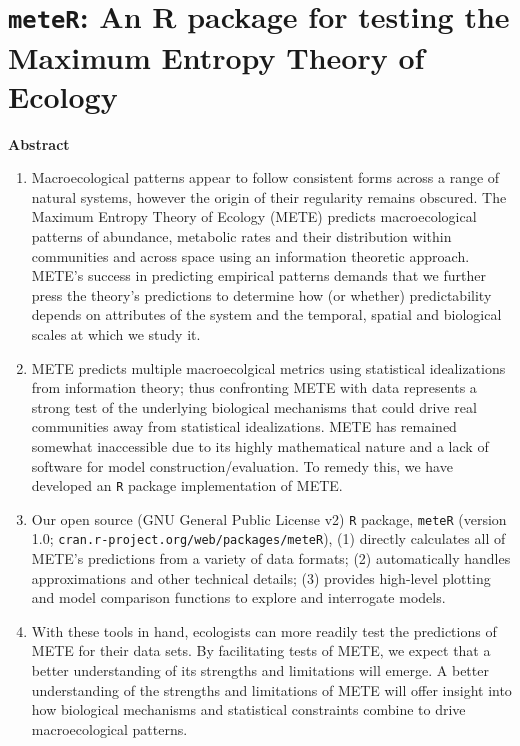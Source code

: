 \chapter{\texttt{meteR}: An R package for testing the Maximum Entropy Theory of Ecology}

\begin{center}
\textbf{Abstract}
\end{center}


\begin{enumerate}
\item Macroecological patterns appear to follow consistent forms
  across a range of natural systems, however the origin of their
  regularity remains obscured. The Maximum Entropy Theory of Ecology
  (METE) predicts macroecological patterns of abundance, metabolic
  rates and their distribution within communities and across space
  using an information theoretic approach. METE's success in
  predicting empirical patterns demands that we further press the
  theory's predictions to determine how (or whether) predictability
  depends on attributes of the system and the temporal, spatial and
  biological scales at which we study it.
%
\item METE predicts multiple macroecolgical metrics using statistical
  idealizations from information theory; thus confronting METE with
  data represents a strong test of the underlying biological
  mechanisms that could drive real communities away from statistical
  idealizations. METE has remained somewhat inaccessible due to its
  highly mathematical nature and a lack of software for model
  construction/evaluation. To remedy this, we have developed an
  \texttt{R} package implementation of METE.
%
\item Our open source (GNU General Public License v2) \texttt{R} package,
  \texttt{meteR} (version 1.0;
  \texttt{cran.r-project.org/web/packages/meteR}), (1) directly
  calculates
  all of METE's predictions from a variety of data formats; (2)
  automatically handles approximations and other technical details;
  (3) provides high-level plotting and model comparison functions to
  explore and interrogate models. 
%
\item With these tools in hand, ecologists can more readily test the
  predictions of METE for their data sets. By facilitating tests of
  METE, we expect that a better understanding of its strengths and
  limitations will emerge. A better understanding of the strengths and
  limitations of METE will offer insight into how biological
  mechanisms and statistical constraints combine to drive
  macroecological patterns.

\end{enumerate}

